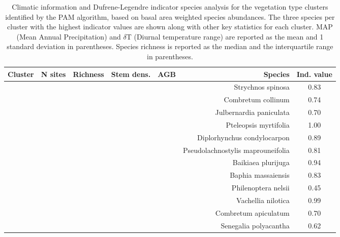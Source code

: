 \begin{table}
\centering
\caption{Climatic information and Dufrene-Legendre indicator species analysis for the vegetation type clusters identified by the PAM algorithm, based on basal area weighted species abundances. The three species per cluster with the highest indicator values are shown along with other key statistics for each cluster. MAP (Mean Annual Precipitation) and $\delta$T (Diurnal temperature range) are reported as the mean and 1 standard deviation in parentheses. Species richness is reported as the median and the interquartile range in parentheses.} 
\label{clust_summ}
\begin{tabular}{S[table-format=1.0]S[table-format=2.0]rrrrS[table-format=1.2]}
  \toprule
{Cluster} & {N sites} & {Richness} & {Stem dens.} & {AGB} & {Species} & {Ind. value} \\ 
  \midrule
{} & {} & {} & {} & {} & Strychnos spinosa & 0.83 \\ 
   & & & & & Combretum collinum & 0.74 \\ 
   & & & & & Julbernardia paniculata & 0.70 \\ 
   \midrule
{} & {} & {} & {} & {} & Pteleopsis myrtifolia & 1.00 \\ 
  	& & & & &  Diplorhynchus condylocarpon & 0.89 \\ 
  	& & & & & Pseudolachnostylis maprouneifolia & 0.81 \\ 
   \midrule
{} & {} &  {} & {} & {} & Baikiaea plurijuga & 0.94 \\ 
  	& & & &  & Baphia massaiensis & 0.83 \\ 
  	& & & &  & Philenoptera nelsii & 0.45 \\ 
   \midrule
{} & {} & {} & {} &  {} & Vachellia nilotica & 0.99 \\ 
  	& & & & & Combretum apiculatum & 0.70 \\ 
  	& & & & & Senegalia polyacantha & 0.62 \\ 
   \bottomrule
\end{tabular}
\end{table}

